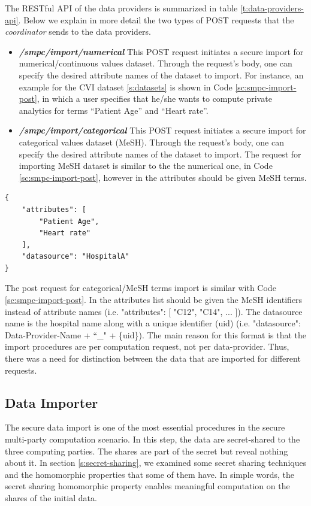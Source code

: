 The RESTful API of the data providers is summarized in table \ref{t:data-providers-api}.
Below we explain in more detail the two types of POST requests that the \textit{coordinator} sends to the data providers.

\begin{itemize}
\item \textbf{\textit{/smpc/import/numerical}}
This POST request initiates a secure import for numerical/continuous values dataset.
Through the request's body, one can specify the desired attribute names of the dataset to import.
For instance, an example for the CVI dataset \ref{s:datasets} is shown in Code \ref{sc:smpc-import-post}, in which a user specifies that he/she wants to compute private analytics for terms ``Patient Age'' and ``Heart rate''.

\item \textbf{\textit{/smpc/import/categorical}}
This POST request initiates a secure import for categorical values dataset (MeSH).
Through the request's body, one can specify the desired attribute names of the dataset to import.
The request for importing MeSH dataset is similar to the the numerical one, in Code \ref{sc:smpc-import-post}, however in the attributes should be given MeSH terms.

\end{itemize}

{
\begin{verbatim}
{
    "attributes": [
        "Patient Age",
        "Heart rate"
    ],
    "datasource": "HospitalA"
}
\end{verbatim}
\label{sc:smpc-import-post}
}

The post request for categorical/MeSH terms import is similar with Code \ref{sc:smpc-import-post}.
In the attributes list should be given the MeSH identifiers instead of attribute names (i.e. "attributes": [ "C12", "C14", ... ]).
The datasource name is the hospital name along with a unique identifier (uid) (i.e. "datasource": Data-Provider-Name + ``\_" + \{uid\}).
The main reason for this format is that the import procedures are per computation request, not per data-provider.
Thus, there was a need for distinction between the data that are imported for different requests.


\subsection{Data Importer}\label{ss:data-providers-importer}
The secure data import is one of the most essential procedures in the secure multi-party computation scenario.
In this step, the data are secret-shared to the three computing parties.
The shares are part of the secret but reveal nothing about it.
In section \ref{s:secret-sharing}, we examined some secret sharing techniques and the homomorphic properties that some of them have.
In simple words, the secret sharing homomorphic property enables meaningful computation on the shares of the initial data.

